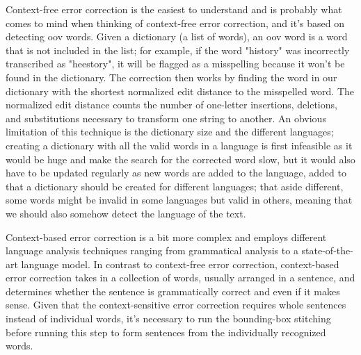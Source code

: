 Context-free error correction is the easiest to understand and is probably what comes to mind when thinking of context-free error correction, and it's based on detecting \gls{oov} words. Given a dictionary (a list of words), an \gls{oov} word is a word that is not included in the list; for example, if the word "history" was incorrectly transcribed as "heestory", it will be flagged as a misspelling because it won't be found in the dictionary. The correction then works by finding the word in our dictionary with the shortest normalized edit distance to the misspelled word. The normalized edit distance \cite{yujian_normalized_2007} counts the number of one-letter insertions, deletions, and substitutions necessary to transform one string to another. An obvious limitation of this technique is the dictionary size and the different languages; creating a dictionary with all the valid words in a language is first infeasible as it would be huge and make the search for the corrected word slow, but it would also have to be updated regularly as new words are added to the language, added to that a dictionary should be created for different languages; that aside different, some words might be invalid in some languages but valid in others, meaning that we should also somehow detect the language of the text.

Context-based error correction is a bit more complex and employs different language analysis techniques ranging from grammatical analysis to a state-of-the-art language model. In contrast to context-free error correction, context-based error correction takes in a collection of words, usually arranged in a sentence, and determines whether the sentence is grammatically correct and even if it makes sense. Given that the context-sensitive error correction requires whole sentences instead of individual words, it's necessary to run the bounding-box stitching before running this step to form sentences from the individually recognized words. 
